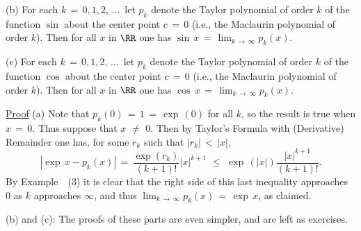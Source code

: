 {\V

        (b) For each $k \,=\, 0,1,2,\,{\ldots}\,$ let $p_{k}$ denote the Taylor polynomial of order $k$ of the function ${\sin}$ about the center point $c \,=\, 0$ (i.e., the Maclaurin polynomial of order $k$).
    Then for all $x$ in ${\RR}$ one has ${\sin}\,x \,=\, \lim_{k \,{\rightarrow}\, {\infty}} p_{k}(x)$.

\V

        (c) For each $k \,=\, 0,1,2,\,{\ldots}\,$ let $p_{k}$ denote the Taylor polynomial of order $k$ of the function ${\cos}$ about the center point $c \,=\, 0$ (i.e., the Maclaurin polynomial of order $k$).
    Then for all $x$ in ${\RR}$ one has ${\cos}\,x \,=\, \lim_{k \,{\rightarrow}\, {\infty}} p_{k}(x)$.

\V

        \underline{Proof} (a) Note that $p_{k}(0) \,=\, 1 \,=\, {\exp}\,(0)$ for all $k$, so the result is true when $x \,=\, 0$.
    Thus suppose that $x \,\,{\neq}\,\, 0$. Then by Taylor's Formula with (Derivative) Remainder one has, for some $r_{k}$ such that $|r_{k}|\,<\,|x|$,
        \begin{displaymath}
        |{\exp}\, x - p_{k}(x)| \,=\, \frac{{\exp}(r_{k})}{(k+1)!}|x|^{k+1}\,\,{\leq}\,\,{\exp}\,(|x|)\frac{|x|^{k+1}}{(k+1)!}.
        \end{displaymath}
    By Example~~(3) it is clear that the right side of this last inequality approaches~$0$ as $k$ approaches ${\infty}$,
    and thus $\lim_{k \,{\rightarrow}\, {\infty}} p_{k}(x) \,=\, {\exp}\,x$, as claimed.

\V

        (b) and (c): The proofs of these parts are even simpler, and are left as exercises.

\V
\V
}%

